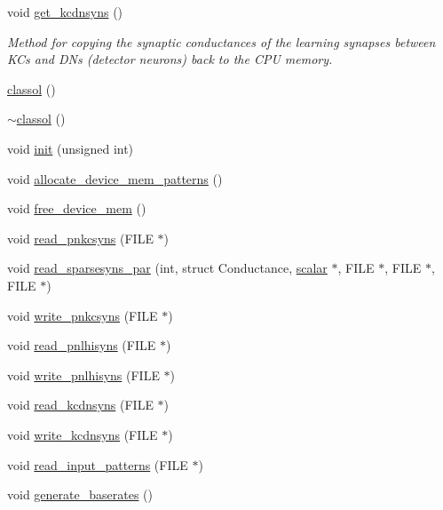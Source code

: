 \begin{DoxyCompactItemize}
void \hyperlink{classclassol_af4700403ad71ef8d07c67883ad914f75}{get\+\_\+kcdnsyns} ()
\begin{DoxyCompactList}\small\item\em Method for copying the synaptic conductances of the learning synapses between K\+Cs and D\+Ns (detector neurons) back to the C\+P\+U memory. \end{DoxyCompactList}\item 
\hyperlink{classclassol_a0f4a2bbdd48bcdfcc2abaa58a839232c}{classol} ()
\item 
\hyperlink{classclassol_a1273a6a57e2127a7b028bdbd92fed9b4}{$\sim$classol} ()
\item 
void \hyperlink{classclassol_ae1d319555e41d814ef2f8407418df8dc}{init} (unsigned int)
\item 
void \hyperlink{classclassol_a224bf755bd74d7512606518ae2658215}{allocate\+\_\+device\+\_\+mem\+\_\+patterns} ()
\item 
void \hyperlink{classclassol_ade653847f5de20fe2f944260d532ddf9}{free\+\_\+device\+\_\+mem} ()
\item 
void \hyperlink{classclassol_a1529539e9d2424d56016ad8e60aa0b79}{read\+\_\+pnkcsyns} (F\+I\+L\+E $\ast$)
\item 
void \hyperlink{classclassol_a0aa3dc991bd9e89071e9333d32757157}{read\+\_\+sparsesyns\+\_\+par} (int, struct Conductance, \hyperlink{sizes_8h_afad04d16ebd8523dd0d5f74145280a40}{scalar} $\ast$, F\+I\+L\+E $\ast$, F\+I\+L\+E $\ast$, F\+I\+L\+E $\ast$)
\item 
void \hyperlink{classclassol_a272983bc77c8c547310a38fd340c29e4}{write\+\_\+pnkcsyns} (F\+I\+L\+E $\ast$)
\item 
void \hyperlink{classclassol_a135ee4ab60d3afa11c5cba74d362fbe6}{read\+\_\+pnlhisyns} (F\+I\+L\+E $\ast$)
\item 
void \hyperlink{classclassol_a661def594f59444eac7a0a08e599ec07}{write\+\_\+pnlhisyns} (F\+I\+L\+E $\ast$)
\item 
void \hyperlink{classclassol_a5530acb74e884fe7b802e2e6eaec9c3a}{read\+\_\+kcdnsyns} (F\+I\+L\+E $\ast$)
\item 
void \hyperlink{classclassol_ad409b77aceb2136bbc069b1ec55d7998}{write\+\_\+kcdnsyns} (F\+I\+L\+E $\ast$)
\item 
void \hyperlink{classclassol_a554e027fafa47fbf9ee68e9e5bd91de2}{read\+\_\+input\+\_\+patterns} (F\+I\+L\+E $\ast$)
\item 
void \hyperlink{classclassol_a4e4e5bee0655e84dfee6e98e6a75dc3b}{generate\+\_\+baserates} ()
\item 

\end{DoxyCompactItemize}
